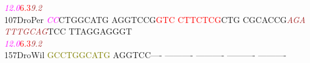 \documentclass[11pt,twoside,reqno,a4paper]{article}
\begin{document}
{\hspace*{4\charwidth}\hspace*{7\charwidth}\hspace*{0\charwidth}\textit{\textcolor{magenta}{12.0}}\hspace*{1\charwidth}\hspace*{13\charwidth}\textcolor{red}{6.3}\hspace*{1\charwidth}\hspace*{1\charwidth}\hspace*{17\charwidth}\textit{\textcolor{brown}{9.2}}\hspace*{1\charwidth}\hspace*{1\charwidth}\hspace*{1\charwidth}\\
107\hspace*{1\charwidth}DroPer	\textit{\textcolor{magenta}{C}}\textit{\textcolor{magenta}{C}}CTGGCATG	AGGTCCG\textcolor{red}{G}\textcolor{red}{T}\textcolor{red}{C}	\textcolor{red}{C}\textcolor{red}{T}\textcolor{red}{T}\textcolor{red}{C}\textcolor{red}{T}\textcolor{red}{C}\textcolor{red}{G}CTG	CGCACCG\textit{\textcolor{brown}{A}}\textit{\textcolor{brown}{G}}\textit{\textcolor{brown}{A}}	\textit{\textcolor{brown}{T}}\textit{\textcolor{brown}{T}}\textit{\textcolor{brown}{T}}\textit{\textcolor{brown}{G}}\textit{\textcolor{brown}{C}}\textit{\textcolor{brown}{A}}\textit{\textcolor{brown}{G}}TCC	TTAGGAGGGT	\\
\hspace*{4\charwidth}\hspace*{7\charwidth}\hspace*{0\charwidth}\textit{\textcolor{magenta}{12.0}}\hspace*{1\charwidth}\hspace*{13\charwidth}\textcolor{red}{6.3}\hspace*{1\charwidth}\hspace*{1\charwidth}\hspace*{17\charwidth}\textit{\textcolor{brown}{9.2}}\hspace*{1\charwidth}\hspace*{1\charwidth}\hspace*{1\charwidth}\\
157\hspace*{1\charwidth}DroWil	\textcolor{olive}{G}\textcolor{olive}{C}\textcolor{olive}{C}\textcolor{olive}{T}\textcolor{olive}{G}\textcolor{olive}{G}\textcolor{olive}{C}\textcolor{olive}{A}\textcolor{olive}{T}\textcolor{olive}{G}	AGGTCC----	----------	----------	----------	----------	\\
}
\end{document}
